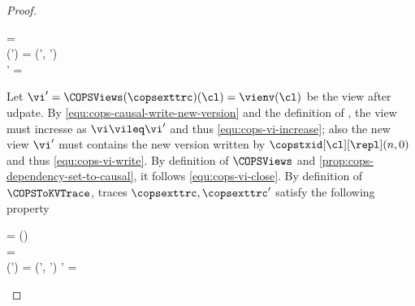 \begin{proof}
\begin{enumerate}
\begin{enumerate}
\begin{Formulae}
\begin{Formula}
\begin{multlined}
            \land \copsexttrc = 
            \\ {} \land \LastConf(\copsexttrc') = (\cops', \copsctxenv')
            \\ {} \land \copsctxenv' = \copsctxenv{}
        \end{multlined}
        \label{equ:cops-causal-write-new-version}
        \end{Formula}
        \end{Formulae}
        Let \( \vi' = \COPSViews(\copsexttrc)(\cl) = \vienv(\cl) \) be the view after udpate.
        By \cref{equ:cops-causal-write-new-version} and the definition of \COPSViews, 
        the view must incresse as \(\vi \vileq \vi' \) and thus \cref{equ:cops-vi-increase};
        also the new view \( \vi' \) must contains the new version written by \(\copstxid[\cl][\repl](n,0) \)
        and thus \cref{equ:cops-vi-write}.
        By definition of \( \COPSViews\) and \cref{prop:cops-dependency-set-to-causal}, 
        it follows \cref{equ:cops-vi-close}.
        By definition of \( \COPSToKVTrace \), traces \( \copsexttrc, \copsexttrc' \) satisfy the following property
        \begin{Formulae}
        \begin{Formula}
        \begin{multlined}
            \vi = \vienv(\cl) 
            \\ {} \land \copsexttrc =  
            \\ {} \land \LastConf(\copsexttrc') = (\cops', \copsctxenv')
            \land \copsctxenv' = \copsctxenv{}
        \end{multlined}
        \label{equ:cops-causal-read-versions}
        \end{Formula}
        \end{Formulae}

\end{enumerate}
\end{enumerate}
\end{proof}
